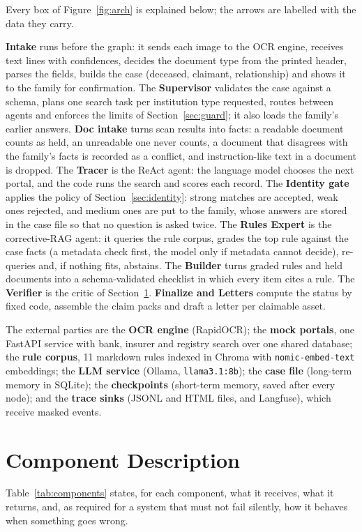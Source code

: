 \documentclass[12pt,a4paper,oneside]{report}
\begin{document}


Every box of Figure~\ref{fig:arch} is explained below; the arrows are labelled with the data they carry.

\textbf{Intake} runs before the graph: it sends each image to the OCR engine, receives text lines with confidences, decides the document type from the printed header, parses the fields, builds the case (deceased, claimant, relationship) and shows it to the family for confirmation. The \textbf{Supervisor} validates the case against a schema, plans one search task per institution type requested, routes between agents and enforces the limits of Section~\ref{sec:guard}; it also loads the family's earlier answers. \textbf{Doc intake} turns scan results into facts: a readable document counts as held, an unreadable one never counts, a document that disagrees with the family's facts is recorded as a conflict, and instruction-like text in a document is dropped. The \textbf{Tracer} is the ReAct agent: the language model chooses the next portal, and the code runs the search and scores each record. The \textbf{Identity gate} applies the policy of Section~\ref{sec:identity}: strong matches are accepted, weak ones rejected, and medium ones are put to the family, whose answers are stored in the case file so that no question is asked twice. The \textbf{Rules Expert} is the corrective-RAG agent: it queries the rule corpus, grades the top rule against the case facts (a metadata check first, the model only if metadata cannot decide), re-queries and, if nothing fits, abstains. The \textbf{Builder} turns graded rules and held documents into a schema-validated checklist in which every item cites a rule. The \textbf{Verifier} is the critic of Section~\ref{sec:components}. \textbf{Finalize and Letters} compute the status by fixed code, assemble the claim packs and draft a letter per claimable asset.

The external parties are the \textbf{OCR engine} (RapidOCR); the \textbf{mock portals}, one FastAPI service with bank, insurer and registry search over one shared database; the \textbf{rule corpus}, 11 markdown rules indexed in Chroma with \texttt{nomic-embed-text} embeddings; the \textbf{LLM service} (Ollama, \texttt{llama3.1:8b}); the \textbf{case file} (long-term memory in SQLite); the \textbf{checkpoints} (short-term memory, saved after every node); and the \textbf{trace sinks} (JSONL and HTML files, and Langfuse), which receive masked events.

\section{Component Description}\label{sec:components}
Table~\ref{tab:components} states, for each component, what it receives, what it returns, and, as required for a system that must not fail silently, how it behaves when something goes wrong.
\end{document}
